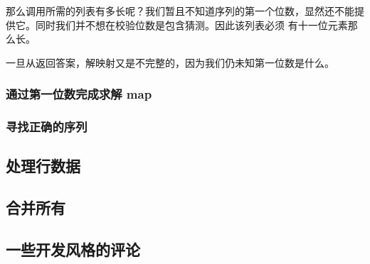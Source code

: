 \documentclass[./main.tex]{subfiles}
\begin{document}
那么调用所需的列表有多长呢？我们暂且不知道序列的第一个位数，显然还不能提供它。同时我们并不想在校验位数是包含猜测。因此该列表必须
有十一位元素那么长。

一旦从返回答案，解映射又是不完整的，因为我们仍未知第一位数是什么。

\subsubsection*{通过第一位数完成求解 map}

\subsubsection*{寻找正确的序列}

\subsection*{处理行数据}

\subsection*{合并所有}

\subsection*{一些开发风格的评论}
\end{document}
